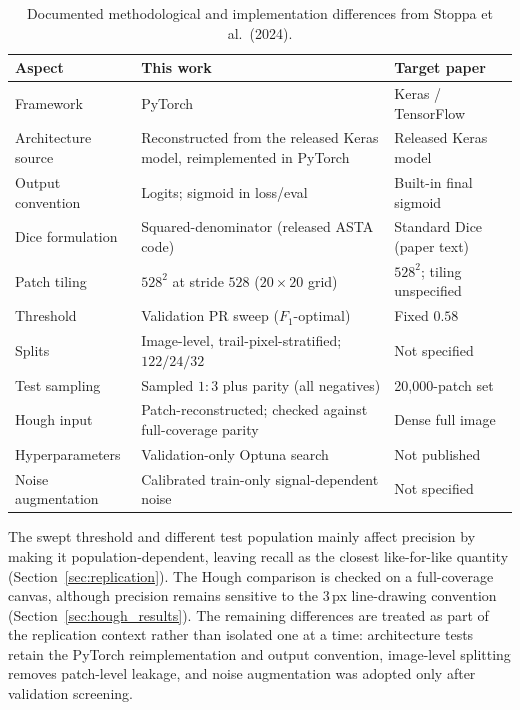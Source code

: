 \documentclass{cam-thesis}
\begin{document}
\begin{table}[htbp]
  \centering
  \caption{Documented methodological and implementation differences from
           Stoppa et al.\ (2024).}
  \label{tab:deviations}
  \begin{tabular}{p{}p{}p{}}
    \toprule
    Aspect & This work & Target paper \\
    \midrule
    Framework & PyTorch & Keras / TensorFlow \\
    Architecture source & Reconstructed from the released Keras model,
      reimplemented in PyTorch & Released Keras model \\
    Output convention & Logits; sigmoid in loss/eval & Built-in final sigmoid \\
    Dice formulation & Squared-denominator (released ASTA code) & Standard Dice
      (paper text) \\
    Patch tiling & $528^2$ at stride $528$ ($20\times20$ grid) & $528^2$; tiling
      unspecified \\
    Threshold & Validation PR sweep ($F_1$-optimal) & Fixed $0.58$ \\
    Splits & Image-level, trail-pixel-stratified; $122/24/32$ & Not specified \\
    Test sampling & Sampled $1{:}3$ plus parity (all negatives) & 20{,}000-patch
      set \\
    Hough input & Patch-reconstructed; checked against full-coverage parity & Dense full image \\
    Hyperparameters & Validation-only Optuna search & Not published \\
    Noise augmentation & Calibrated train-only signal-dependent noise & Not
      specified \\
    \bottomrule
  \end{tabular}
\end{table}

\newpage

\noindent The swept threshold and different test population mainly affect precision by
making it population-dependent, leaving recall as the closest like-for-like
quantity (Section~\ref{sec:replication}). The Hough comparison is checked on a
full-coverage canvas, although precision remains sensitive to the $3$\,px
line-drawing convention (Section~\ref{sec:hough_results}). The remaining
differences are treated as part of the replication context rather than isolated
one at a time: architecture tests retain the PyTorch reimplementation and output
convention, image-level splitting removes patch-level leakage, and noise
augmentation was adopted only after validation screening.
\end{document}
